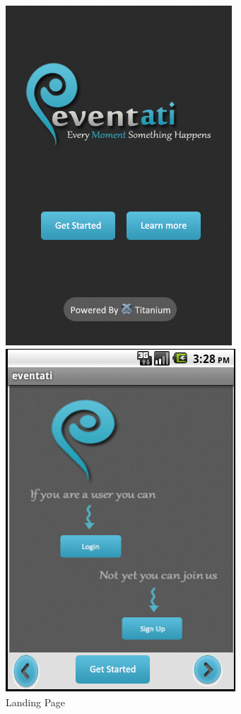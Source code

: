 \documentclass[12pt,a4paper,class,twoside,openany]{report}
\begin{document}
{\begin{figure}
\begin{minipage}[b]{0.5\linewidth}
	\centering
	\includegraphics[height=4 in]{6-17}
	\caption{Landing Page}
     \label{fg:6-17}
	\end{minipage}
	\hspace{0.5cm}
	\begin{minipage}[b]{0.5\linewidth}
	\centering
	\includegraphics[width=\textwidth]{6-18}

\end{minipage}
\end{figure}}
\end{document}
